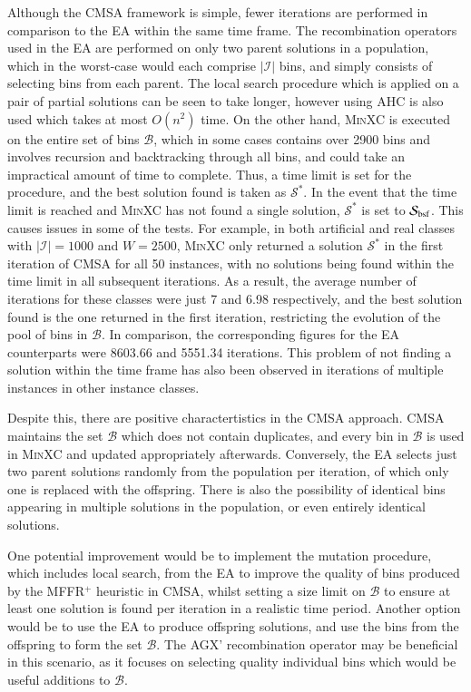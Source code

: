 \documentclass[authoryear]{elsarticle}
\begin{document}
Although the CMSA framework is simple, fewer iterations are performed in comparison to the EA within the same time frame. The recombination operators used in the EA are performed on only two parent solutions in a population, which in the worst-case would each comprise $|\mathcal{I}|$ bins, and simply consists of selecting bins from each parent. The local search procedure which is applied on a pair of partial solutions can be seen to take longer, however using AHC is also used which takes at most $O(n^2)$ time. On the other hand, \textsc{MinXC} is executed on the entire set of bins $\mathcal{B}$, which in some cases contains over 2900 bins and involves recursion and backtracking through all bins, and could take an impractical amount of time to complete. Thus, a time limit is set for the procedure, and the best solution found is taken as $\mathcal{S}^*$. In the event that the time limit is reached and \textsc{MinXC} has not found a single solution, $\mathcal{S}^*$ is set to $\mathcal{S}_{\textup{bsf}}$. This causes issues in some of the tests. For example, in both artificial and real classes with $|\mathcal{I}| = 1000$ and $W =2500$, \textsc{MinXC} only returned a solution $\mathcal{S}^*$ in the first iteration of CMSA for all 50 instances, with no solutions being found within the time limit in all subsequent iterations. As a result, the average number of iterations for these classes were just 7 and 6.98 respectively, and the best solution found is the one returned in the first iteration, restricting the evolution of the pool of bins in $\mathcal{B}$. In comparison, the corresponding figures for the EA counterparts were 8603.66 and 5551.34 iterations. This problem of not finding a solution within the time frame has also been observed in iterations of multiple instances in other instance classes.

Despite this, there are positive charactertistics in the CMSA approach. CMSA maintains the set $\mathcal{B}$ which does not contain duplicates, and every bin in $\mathcal{B}$ is used in \textsc{MinXC} and updated appropriately afterwards. Conversely, the EA selects just two parent solutions randomly from the population per iteration, of which only one is replaced with the offspring. There is also the possibility of identical bins appearing in multiple solutions in the population, or even entirely identical solutions. 

One potential improvement would be to implement the mutation procedure, which includes local search, from the EA to improve the quality of bins produced by the MFFR$^+$ heuristic in CMSA, whilst setting a size limit on $\mathcal{B}$ to ensure at least one solution is found per iteration in a realistic time period. Another option would be to use the EA to produce offspring solutions, and use the bins from the offspring to form the set $\mathcal{B}$. The AGX' recombination operator may be beneficial in this scenario, as it focuses on selecting quality individual bins which would be useful additions to $\mathcal{B}$.
\end{document}

